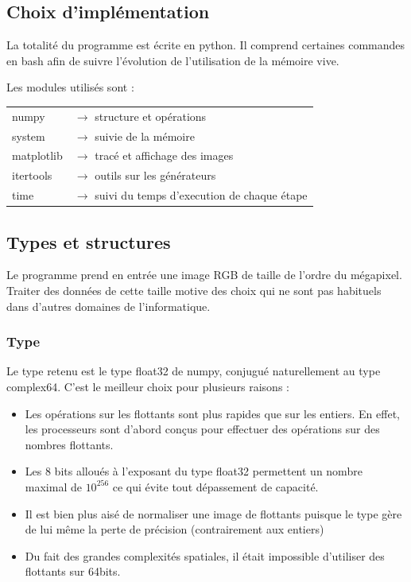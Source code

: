 \documentclass{article}
\begin{document}
\begin{multicols}{2}

\section{Choix d'implémentation}

La totalité du programme est écrite en python. Il comprend certaines commandes en bash afin de suivre l'évolution de l'utilisation de la mémoire vive.

Les modules utilisés sont :

\begin{tabular}{l p{5cm}}
	numpy & $\longrightarrow$ structure et opérations \\
	system & $\longrightarrow$ suivie de la mémoire \\
	matplotlib & $\longrightarrow$ tracé et affichage des images \\
	itertools & $\longrightarrow$ outils sur les générateurs \\
	time & $\longrightarrow$ suivi du temps d'execution de chaque étape
\end{tabular}

\subsection{Types et structures}

Le programme prend en entrée une image RGB de taille de l'ordre du mégapixel. Traiter des données de cette taille motive des choix qui ne sont pas habituels dans d'autres domaines de l'informatique.

\subsubsection{Type}
Le type retenu est le type float32 de numpy, conjugué naturellement au type complex64. C'est le meilleur choix pour plusieurs raisons :
\begin{itemize}
	\item Les opérations sur les flottants sont plus rapides que sur les entiers. En effet, les processeurs sont d'abord conçus pour effectuer des opérations sur des nombres flottants.
	\item Les 8 bits alloués à l'exposant du type float32 permettent un nombre maximal de $10^{256}$ ce qui évite tout dépassement de capacité.
	\item Il est bien plus aisé de normaliser une image de flottants puisque le type gère de lui même la perte de précision (contrairement aux entiers)
	\item Du fait des grandes complexités spatiales, il était impossible d'utiliser des flottants sur 64bits.
\end{itemize}


\end{multicols}
\end{document}
